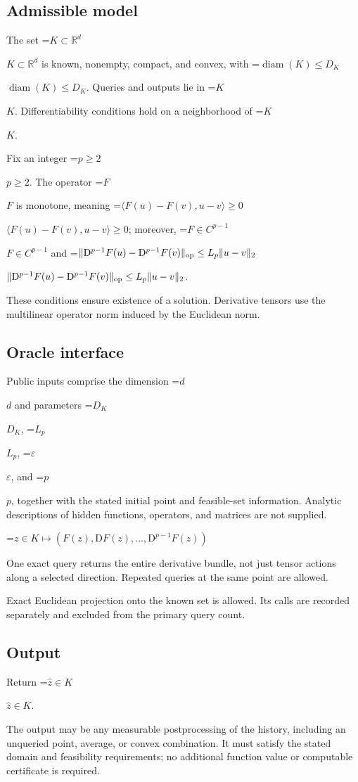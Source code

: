 \documentclass[10pt,a4paper]{article}
\newcommand{\AtlasMath}[1]{\par\begingroup\centering\setbox0=\hbox{$\displaystyle #1$}\ifdim\wd0>1.4\linewidth\typeout{ATLAS WIDE FORMULA: \the\wd0}\fi\ifdim\wd0>\linewidth\resizebox{\linewidth}{!}{\box0}\else\box0\fi\par\endgroup}
\newcommand{\AtlasInlineMath}[1]{\begingroup\setbox0=\hbox{$#1$}\ifdim\wd0>.4\linewidth\endgroup\AtlasMath{#1}\else\endgroup$#1$\fi}
\begin{document}
\subsection{Admissible model}
The set \AtlasInlineMath{K\subset\mathbb{R}^d} is known, nonempty, compact, and convex, with \AtlasInlineMath{\operatorname{diam}(K)\le D_K}. Queries and outputs lie in \AtlasInlineMath{K}. Differentiability conditions hold on a neighborhood of \AtlasInlineMath{K}.

Fix an integer \AtlasInlineMath{p\ge2}. The operator \AtlasInlineMath{F} is monotone, meaning \AtlasInlineMath{\langle F(u)-F(v),u-v\rangle\ge0}; moreover, \AtlasInlineMath{F\in C^{p-1}} and \AtlasInlineMath{\|\mathrm{D}^{p-1}F(u)-\mathrm{D}^{p-1}F(v)\|_{\rm op}\le L_p\|u-v\|_2}.

These conditions ensure existence of a solution. Derivative tensors use the multilinear operator norm induced by the Euclidean norm.

\subsection{Oracle interface}
Public inputs comprise the dimension \AtlasInlineMath{d} and parameters \AtlasInlineMath{D_K}, \AtlasInlineMath{L_p}, \AtlasInlineMath{\varepsilon}, and \AtlasInlineMath{p}, together with the stated initial point and feasible-set information. Analytic descriptions of hidden functions, operators, and matrices are not supplied.


\AtlasMath{z\in K\longmapsto(F(z),\mathrm{D}F(z),\ldots,\mathrm{D}^{p-1}F(z))}


One exact query returns the entire derivative bundle, not just tensor actions along a selected direction. Repeated queries at the same point are allowed.

Exact Euclidean projection onto the known set is allowed. Its calls are recorded separately and excluded from the primary query count.

\subsection{Output}
Return \AtlasInlineMath{\widehat{z}\in K}.

The output may be any measurable postprocessing of the history, including an unqueried point, average, or convex combination. It must satisfy the stated domain and feasibility requirements; no additional function value or computable certificate is required.
\end{document}
